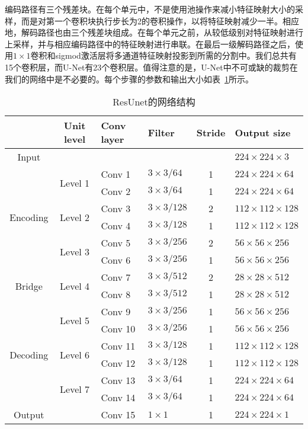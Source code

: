 \begin{translation}
编码路径有三个残差块。在每个单元中，不是使用池操作来减小特征映射大小的采样，而是对第一个卷积块执行步长为2的卷积操作，以将特征映射减少一半。相应地，解码路径也由三个残差块组成。在每个单元之前，从较低级别对特征映射进行上采样，并与相应编码路径中的特征映射进行串联。在最后一级解码路径之后，使用$1\times1$卷积和sigmod激活层将多通道特征映射投影到所需的分割中。我们总共有15个卷积层，而U-Net有23个卷积层。值得注意的是，U-Net中不可或缺的裁剪在我们的网络中是不必要的。每个步骤的参数和输出大小如表~\ref{Table:Feature Size}所示。
\begin{table}[!htb]
	\tiny
	\centering
	\caption{ResUnet的网络结构}	
	\label{Table:Feature Size}	
	\begin{tabular}{ccllcl}
		\hline
		\hline
		& Unit level  & Conv layer & Filter  & Stride &  Output size\\
		\hline
		Input                      &        &     &   &    &  $224\times 224 \times 3$ \\
		\hline	
		\multirow{6}{*}{Encoding}
		& \multirow{2}{*}{Level 1}& Conv 1  & $3\times 3/64$ & 1 &  $224\times 224 \times 64$ \\
		&        & Conv 2  &  $3\times 3/64$ & 1 &  $224\times 224 \times 64$ \\
		\cline{2-6}			
		& \multirow{2}{*}{Level 2}& Conv 3  &  $3\times 3/128$ & 2 &  $112\times 112 \times 128$ \\
		&        & Conv 4  &  $3\times 3/128$ & 1 &  $112\times 112 \times 128$ \\
		\cline{2-6}
		& \multirow{2}{*}{Level 3}& Conv 5  &  $3\times 3/256$ & 2 &  $56\times 56 \times 256$ \\
		&        & Conv 6  &  $3\times 3/256$ & 1 &  $56\times 56 \times 256$ \\
		\cline{2-6}						
		\hline
		\multirow{2}{*}{Bridge}
		&\multirow{2}{*}{Level 4}         &Conv 7  &  $3\times 3/512$ & 2 &  $28\times 28 \times 512$ \\
		&	      &Conv 8 &  $3\times 3/512$ & 1 &  $28\times 28 \times 512$\\
		\hline
		\multirow{6}{*}{Decoding}	
		& \multirow{2}{*}{Level 5} &Conv 9 &  $3\times 3/256$ & 1 &  $56\times 56 \times 256$ \\
		&        &Conv 10 &  $3\times 3/256$ & 1 & $56\times 56 \times 256$ \\
		\cline{2-6}
		& \multirow{2}{*}{Level 6} &Conv 11 &  $3\times 3/128$ & 1 &  $112\times 112 \times 128$ \\
		&        &Conv 12 &  $3\times 3/128$ & 1 &  $112\times 112 \times 128$ \\
		\cline{2-6}			
		& \multirow{2}{*}{Level 7} &Conv 13 &  $3\times 3/64$ & 1 &   $224\times 224 \times 64$ \\
		&        &Conv 14 &  $3\times 3/64$ & 1 &  $224\times 224 \times 64$ \\
		\hline
		Output                      &        &Conv 15 &  $1\times 1$ & 1 &  $224\times 224 \times 1$ \\		
		\hline
		\hline
	\end{tabular}
\end{table}


\end{translation}
